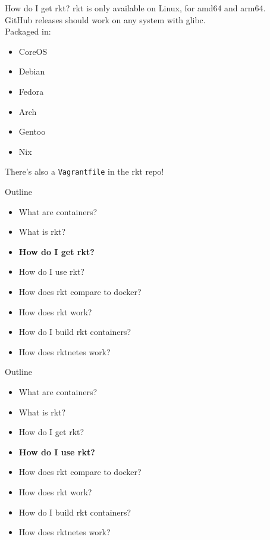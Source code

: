 \documentclass[pdf,aspectratio=169]{beamer}
\begin{document}
\begin{frame}{How do I get rkt?}
    rkt is only available on Linux, for amd64 and arm64. \\
    GitHub releases should work on any system with glibc. \\
    \pause
    \vspace{1em}
    Packaged in:
    \begin{itemize}
        \item CoreOS
        \item Debian
        \item Fedora
        \item Arch
        \item Gentoo
        \item Nix
    \end{itemize}
    \pause
    There's also a \texttt{Vagrantfile} in the rkt repo!
\end{frame}


\begin{frame}
    Outline
    \begin{itemize}
        \item What are containers?
        \item What is rkt?
        \item \textbf{How do I get rkt?}
        \item How do I use rkt?
        \item How does rkt compare to docker?
        \item How does rkt work?
        \item How do I build rkt containers?
        \item How does rktnetes work?
    \end{itemize}
\end{frame}

\begin{frame}
    Outline
    \begin{itemize}
        \item What are containers?
        \item What is rkt?
        \item How do I get rkt?
        \item \textbf{How do I use rkt?}
        \item How does rkt compare to docker?
        \item How does rkt work?
        \item How do I build rkt containers?
        \item How does rktnetes work?
    \end{itemize}
\end{frame}
\end{document}
